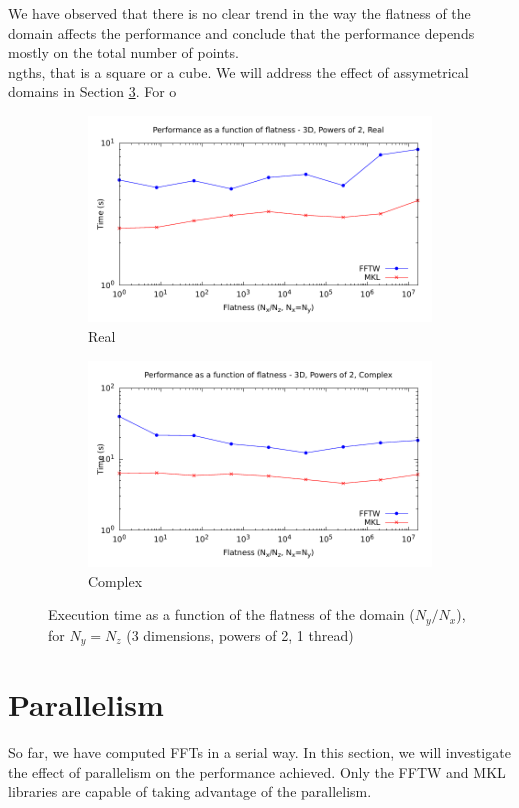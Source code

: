 \documentclass[12pt, a4paper]{article}
\begin{document}
We have observed that there is no clear trend in the way the flatness of the domain affects the performance and conclude that the performance depends mostly on the total number of points.\\
ngths, that is a square or a cube. We will address the effect of assymetrical domains in Section \ref{FLATNESS}. For o
\begin{figure}[H]
\captionsetup{width=0.8\linewidth}
\centering
\begin{subfigure}{.5\textwidth}
\centering
\includegraphics[width=.9\linewidth]{graphs/flatness-r.pdf}
\caption{Real}
\label{FLATNESSR}
\end{subfigure}%
\begin{subfigure}{.5\textwidth}
\centering
\includegraphics[width=.9\linewidth]{graphs/flatness-c.pdf}
\caption{Complex}
\label{FLATNESSC}
\end{subfigure}
\caption{Execution time as a function of the flatness of the domain ($N_y/N_x$), for $N_y=N_z$ (3 dimensions, powers of 2, 1 thread)}
\label{FLATNESS}
\end{figure}

\section{Parallelism}
So far, we have computed FFTs in a serial way. In this section, we will investigate the effect of parallelism on the performance achieved. Only the FFTW and MKL libraries are capable of taking advantage of the parallelism.  
\end{document}
